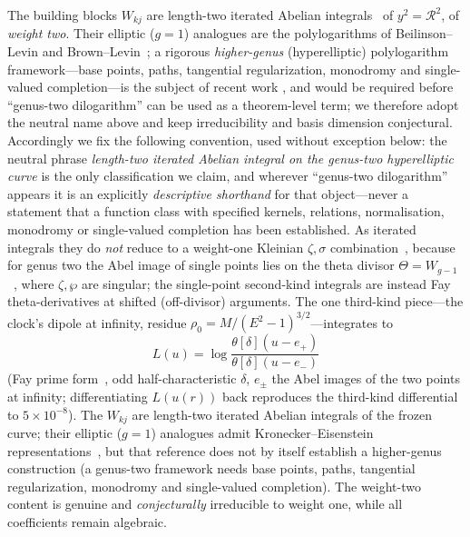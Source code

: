 \documentclass[12pt]{iopart}
\theoremstyle{plain}
\theoremstyle{definition}
\theoremstyle{remark}
\begin{document}
The building blocks $W_{kj}$ are length-two iterated Abelian
integrals~\cite{Chen1977} of $y^2=\mathcal{R}^2$, of \emph{weight two}. Their elliptic
($g{=}1$) analogues are the polylogarithms of Beilinson--Levin and
Brown--Levin~\cite{BeilinsonLevin1994,BrownLevin2011}; a rigorous \emph{higher-genus}
(hyperelliptic) polylogarithm framework---base points, paths, tangential
regularization, monodromy and single-valued completion---is the subject of recent work
\cite{BauneEtal2024,DHokerSchlotterer2024,DHokerHiddingSchlotterer2025,DHokerEnriquezSchlottererZerbini2026},
and would be required before ``genus-two
dilogarithm'' can be used as a theorem-level term; we therefore adopt the neutral name
above and keep irreducibility and basis dimension conjectural. Accordingly we fix the
following convention, used without exception below: the neutral phrase
\emph{length-two iterated Abelian integral on the genus-two hyperelliptic curve} is the
only classification we claim, and wherever ``genus-two dilogarithm'' appears it is an
explicitly \emph{descriptive shorthand} for that object---never a statement that a
function class with specified kernels, relations, normalisation, monodromy or
single-valued completion has been established. As iterated integrals
they do \emph{not} reduce to a weight-one Kleinian $\zeta,\sigma$
combination~\cite{BakerAbelian1897,BuchstaberEnolskii1997}, because for
genus two the Abel image of single points lies on the theta divisor
$\Theta=W_{g-1}$~\cite{MumfordTata}, where $\zeta,\wp$ are singular; the single-point
second-kind integrals are instead Fay theta-derivatives at shifted (off-divisor)
arguments. The one third-kind piece---the clock's dipole at infinity, residue
$\rho_0=M/(E^2-1)^{3/2}$---integrates to
\begin{equation}
    L(u)=\log\frac{\theta[\delta](u-e_+)}{\theta[\delta](u-e_-)}
    \label{eq:thirdkind-theta}
\end{equation}
(Fay prime form~\cite{Fay1973}, odd half-characteristic $\delta$, $e_\pm$ the Abel
images of the two points at infinity; differentiating $L(u(r))$ back reproduces the
third-kind differential to $5\times10^{-8}$). The $W_{kj}$ are length-two iterated Abelian integrals of the frozen curve; their
elliptic ($g{=}1$) analogues admit Kronecker--Eisenstein
representations~\cite{BeilinsonLevin1994}, but that reference does not by itself
establish a higher-genus construction (a genus-two framework needs base points, paths,
tangential regularization, monodromy and single-valued completion). The
weight-two content is genuine and \emph{conjecturally} irreducible to weight one, while
all coefficients remain
algebraic.
\end{document}
